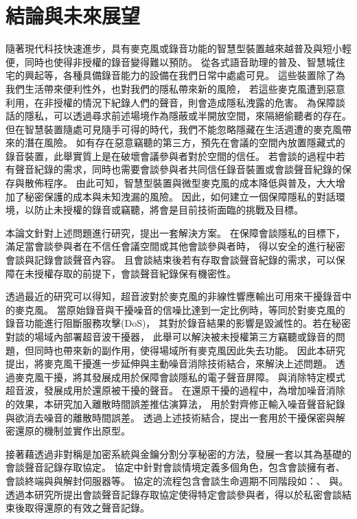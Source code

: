 \chapter{結論與未來展望}\label{chapter:conclusion}

    隨著現代科技快速進步，具有麥克風或錄音功能的智慧型裝置越來越普及與短小輕便，同時也使得非授權的錄音變得難以預防。
從各式語音助理的普及、智慧城住宅的興起等，各種具備錄音能力的設備在我們日常中處處可見。
這些裝置除了為我們生活帶來便利性外，也對我們的隱私帶來新的風險，
若這些麥克風遭到惡意利用，在非授權的情況下紀錄人們的聲音，則會造成隱私洩露的危害。
為保障談話的隱私，可以透過尋求前述場境作為隱蔽或半開放空間，來隔絕偷聽者的存在。
但在智慧裝置隨處可見隨手可得的時代，我們不能忽略隱藏在生活週遭的麥克風帶來的潛在風險。
如有存在惡意竊聽的第三方，預先在會議的空間內放置隱藏式的錄音裝置，此舉實質上是在破壞會議參與者對於空間的信任。
若會談的過程中若有聲音紀錄的需求，同時也需要會談參與者共同信任錄音裝置或會談聲音紀錄的保存與散佈程序。
由此可知，智慧型裝置與微型麥克風的成本降低與普及，大大增加了秘密保護的成本與未知洩漏的風險。
因此，如何建立一個保障隱私的對話環境，以防止未授權的錄音或竊聽，將會是目前技術面臨的挑戰及目標。

    本論文針對上述問題進行研究，提出一套解決方案。
在保障會談隱私的目標下，滿足當會談參與者在不信任會議空間或其他會談參與者時，
得以安全的進行秘密會談與記錄會談聲音內容。
且會談結束後若有存取會談聲音紀錄的需求，可以保障在未授權存取的前提下，會談聲音紀錄保有機密性。

    透過最近的研究可以得知，超音波對於麥克風的非線性響應輸出可用來干擾錄音中的麥克風。
當原始錄音與干擾噪音的信噪比達到一定比例時，等同於對麥克風的錄音功能進行阻斷服務攻擊(DoS)，
其對於錄音結果的影響是毀滅性的。若在秘密對談的場域內部署超音波干擾器，
此舉可以解決被未授權第三方竊聽或錄音的問題，但同時也帶來新的副作用，使得場域所有麥克風因此失去功能。
因此本研究提出，將麥克風干擾進一步延伸與主動噪音消除技術結合，來解決上述問題。
透過麥克風干擾，將其發展成用於保障會談隱私的電子聲音屏障。
與消除特定模式超音波，發展成用於還原被干擾的聲音。
在還原干擾的過程中，為增加噪音消除的效果，本研究加入離散時間誤差推估演算法，
用於對齊修正輸入噪音聲音紀錄與欲消去噪音的離散時間誤差。
透過上述技術結合，提出一套用於干擾保密與解密還原的機制並實作出原型。

    接著藉透過非對稱是加密系統與金鑰分割分享秘密的方法，發展一套以其為基礎的會談聲音記錄存取協定。
協定中針對會談情境定義多個角色，包含會談擁有者、會談終端與與解封伺服器等。
協定的流程包含會談生命週期不同階段如：、
與。
透過本研究所提出會談聲音記錄存取協定使得特定會談參與者，得以於私密會談結束後取得還原的有效之聲音記錄。

